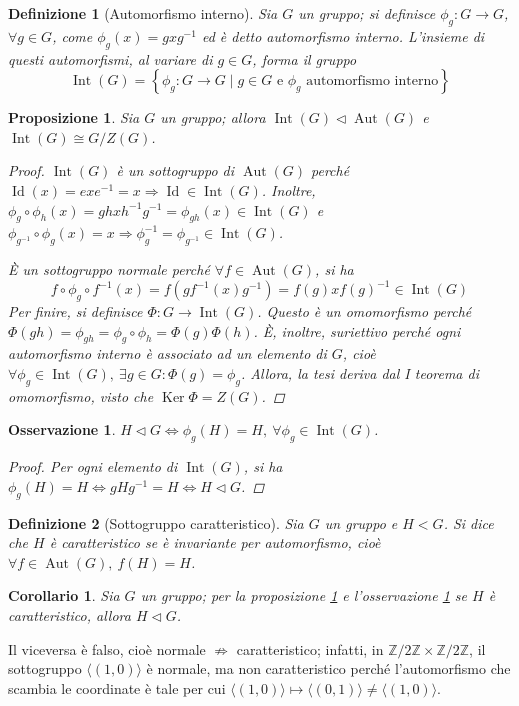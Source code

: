 \documentclass[12pt]{scrartcl}
\theoremstyle{style}
\newtheorem{definizione}{Definizione}[section]
\newtheorem{prop}{Proposizione}[section]
\newtheorem{corollario}{Corollario}[teorema]
\newtheorem{osservazione}{Osservazione}[section]
\numberwithin{equation}{subsection}
\begin{document}
\begin{definizione}
	[Automorfismo interno]
	Sia $G$ un gruppo; si definisce $\phi _g :G\to G$, $ \forall g \in G$, come $\phi_g (x) =gxg^{-1} $ ed \`e detto \textit{automorfismo interno}. 
	L'insieme di questi automorfismi, al variare di $g \in G$, forma il gruppo
	\[
	\operatorname{Int} (G) = \left\{ \phi _g : G\to G  \mid g \in G \text{ e } \phi _g \text{ automorfismo interno} \right\} 
	\] 
\end{definizione}
\begin{prop}\label{intcar}
	Sia $G$ un gruppo; allora $\operatorname{Int} (G) \lhd \operatorname{Aut} (G)$ e $\operatorname{Int} (G) \cong G / Z(G)$.
	\begin{proof}
		$\operatorname{Int} (G)$ \`e un sottogruppo di $\operatorname{Aut} (G)$ perch\'e $\operatorname{Id} (x) = exe^{-1} = x  \Rightarrow \operatorname{Id} \in \operatorname{Int} (G)$.
		Inoltre, $\phi _g \circ \phi _h (x) = ghxh^{-1}g^{-1}=\phi _{gh} (x) \in \operatorname{Int} (G)$ e $\phi _{g^{-1} } \circ \phi _g (x) = x \Rightarrow \phi _g^{-1} = \phi _{g^{-1}} \in \operatorname{Int}(G)  $.

		\`E un sottogruppo normale perch\'e $\forall f \in \operatorname{Aut} (G)$, si ha 
		\[
		f \circ \phi _g \circ f^{-1}(x) = f \left(g f^{-1}(x) g^{-1}\right) =f(g) x f(g)^{-1} \in \operatorname{Int} (G)
		\] 
		Per finire, si definisce $\Phi : G \to \operatorname{Int} (G) $.
		Questo \`e un omomorfismo perch\'e $\Phi(gh)=\phi _{gh} = \phi _g\circ \phi _h = \Phi(g)\Phi(h)$.
		\`E, inoltre, suriettivo perch\'e ogni automorfismo interno \`e associato ad un elemento di $G$, cio\`e $\forall \phi _g \in \operatorname{Int} (G), \ \exists g \in G : \Phi(g) = \phi _g$.
		Allora, la tesi deriva dal I teorema di omomorfismo, visto che $\operatorname{Ker} \Phi = Z(G)$.
	\end{proof}
\end{prop}
\begin{osservazione}\label{ossnorm}
	$H \lhd G \iff \phi _g(H) = H, \ \forall \phi _g \in \operatorname{Int} (G)$.
	\begin{proof}
Per ogni elemento di $\operatorname{Int} (G)$, si ha $\phi _g (H) = H \iff gH g^{-1} = H \iff H \lhd G$.
	\end{proof}
	\end{osservazione}
\begin{definizione}
	[Sottogruppo caratteristico]
	Sia $G$ un gruppo e $H < G$. Si dice che $H$ \`e \textit{caratteristico} se \`e invariante per automorfismo, cio\`e $\forall f \in \operatorname{Aut} (G), \ f(H) = H$.
\end{definizione}
\begin{corollario}
	Sia $G$ un gruppo; per la proposizione \ref{intcar} e l'osservazione \ref{ossnorm} se $H$ \`e caratteristico, allora $H \lhd G$.
\end{corollario}
\noindent Il viceversa \`e falso, cio\`e normale $\not\Rightarrow $ caratteristico; infatti, in $\mathbb{Z} / 2\mathbb{Z} \times  \mathbb{Z} / 2\mathbb{Z}$, il sottogruppo $\langle (1,0) \rangle$ \`e normale, ma non caratteristico perch\'e l'automorfismo che scambia le coordinate \`e tale per cui $\langle (1,0) \rangle\mapsto \langle (0,1) \rangle\neq \langle (1,0) \rangle$.
\end{document}
